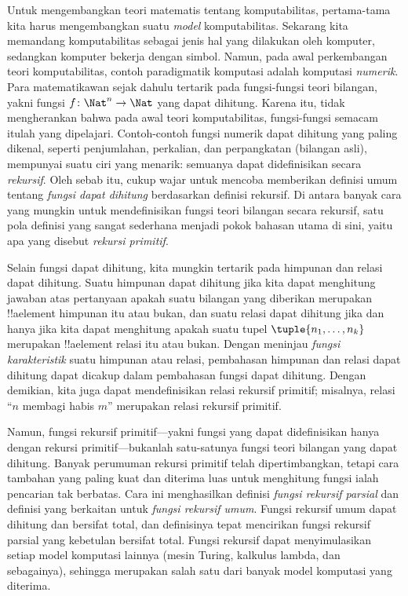 \documentclass[../../../include/open-logic-section]{subfiles}
\begin{document}

Untuk mengembangkan teori matematis tentang komputabilitas, pertama-tama kita
harus mengembangkan suatu \emph{model} komputabilitas. Sekarang kita memandang
komputabilitas sebagai jenis hal yang dilakukan oleh komputer, sedangkan
komputer bekerja dengan simbol. Namun, pada awal perkembangan teori
komputabilitas, contoh paradigmatik komputasi adalah komputasi
\emph{numerik}. Para matematikawan sejak dahulu tertarik pada fungsi-fungsi
teori bilangan, yakni fungsi $f\colon \Nat^n \to \Nat$ yang dapat dihitung.
Karena itu, tidak mengherankan bahwa pada awal teori komputabilitas,
fungsi-fungsi semacam itulah yang dipelajari. Contoh-contoh fungsi numerik
dapat dihitung yang paling dikenal, seperti penjumlahan, perkalian, dan
perpangkatan (bilangan asli), mempunyai suatu ciri yang menarik: semuanya
dapat didefinisikan secara \emph{rekursif}. Oleh sebab itu, cukup wajar untuk
mencoba memberikan definisi umum tentang \emph{fungsi dapat dihitung}
berdasarkan definisi rekursif. Di antara banyak cara yang mungkin untuk
mendefinisikan fungsi teori bilangan secara rekursif, satu pola definisi yang
sangat sederhana menjadi pokok bahasan utama di sini, yaitu apa yang disebut
\emph{rekursi primitif}.

Selain fungsi dapat dihitung, kita mungkin tertarik pada himpunan dan relasi
dapat dihitung. Suatu himpunan dapat dihitung jika kita dapat menghitung
jawaban atas pertanyaan apakah suatu bilangan yang diberikan merupakan
!!a{element} himpunan itu atau bukan, dan suatu relasi dapat dihitung jika dan
hanya jika kita dapat menghitung apakah suatu tupel
$\tuple{n_1, \dots, n_k}$ merupakan !!a{element} relasi itu atau bukan.
Dengan meninjau \emph{fungsi karakteristik} suatu himpunan atau relasi,
pembahasan himpunan dan relasi dapat dihitung dapat dicakup dalam pembahasan
fungsi dapat dihitung. Dengan demikian, kita juga dapat mendefinisikan relasi
rekursif primitif; misalnya, relasi ``$n$ membagi habis $m$'' merupakan relasi
rekursif primitif.

Namun, fungsi rekursif primitif---yakni fungsi yang dapat didefinisikan hanya
dengan rekursi primitif---bukanlah satu-satunya fungsi teori bilangan yang
dapat dihitung. Banyak perumuman rekursi primitif telah dipertimbangkan, tetapi
cara tambahan yang paling kuat dan diterima luas untuk menghitung fungsi ialah
pencarian tak berbatas. Cara ini menghasilkan definisi \emph{fungsi rekursif
  parsial} dan definisi yang berkaitan untuk \emph{fungsi rekursif umum}.
Fungsi rekursif umum dapat dihitung dan bersifat total, dan definisinya tepat
mencirikan fungsi rekursif parsial yang kebetulan bersifat total. Fungsi
rekursif dapat menyimulasikan setiap model komputasi lainnya (mesin Turing,
kalkulus lambda, dan sebagainya), sehingga merupakan salah satu dari banyak
model komputasi yang diterima.
\end{document}

